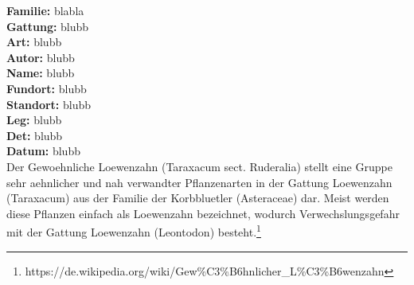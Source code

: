 \documentclass[12pt,a4paper]{article}
\begin{document}
\begin{multicols*}{2}
\vfill\null
{}

\columnbreak\vspace*{\fill}
\noindent\textbf{Familie: } blabla\\
\textbf{Gattung: } blubb\\
\textbf{Art: } blubb\\
\textbf{Autor: } blubb\\
\textbf{Name: } blubb\\
\textbf{Fundort: } blubb\\
\textbf{Standort: } blubb\\
\textbf{Leg: } blubb\\
\textbf{Det: } blubb\\
\textbf{Datum: } blubb\\
{\footnotesize Der Gewoehnliche Loewenzahn (Taraxacum sect. Ruderalia) stellt eine Gruppe sehr aehnlicher und nah verwandter Pflanzenarten in der Gattung Loewenzahn (Taraxacum) aus der Familie der Korbbluetler (Asteraceae) dar. Meist werden diese Pflanzen einfach als Loewenzahn bezeichnet, wodurch Verwechslungsgefahr mit der Gattung Loewenzahn (Leontodon) besteht.\footnote{https://de.wikipedia.org/wiki/Gew\%C3\%B6hnlicher\_L\%C3\%B6wenzahn}
}\end{multicols*}
\newpage
\end{document}
